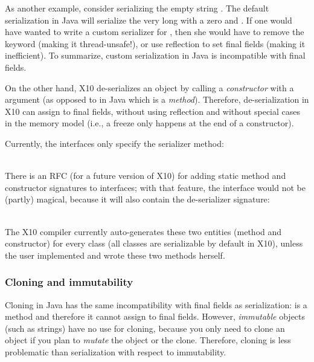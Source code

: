 As another example, consider serializing the empty string .
The default serialization in Java will serialize the very long  with a zero  and .
If one would have wanted to write a custom serializer for ,
    then she would have to remove the  keyword (making it thread-unsafe!),
    or use reflection to set final fields (making it inefficient).
To summarize, custom serialization in Java is incompatible with final fields.

On the other hand, X10 de-serializes an object by calling a \emph{constructor} with a 
    argument (as opposed to  in Java which is a \emph{method}).
Therefore, de-serialization in X10 can assign to final fields, without using reflection
    and without special cases in the memory model (i.e., a freeze only happens at the end of a constructor).

Currently, the  interfaces only specify the serializer method:

~~~~~~~~\\
There is an RFC (for a future version of X10) for adding static method and constructor signatures to interfaces;
    with that feature, the  interface would not be (partly) magical,
    because it will also contain the de-serializer signature:

~~~~~~~~\\
The X10 compiler currently auto-generates these two entities (method and constructor) for every class (all classes are serializable by default in X10),
    unless the user implemented  and wrote these two methods herself.

\subsubsection{Cloning and immutability}
\label{Section:Cloning}
Cloning in Java has the same incompatibility with final fields as serialization:
     is a method and therefore it cannot assign to final fields.
However, \emph{immutable} objects (such as strings) have no use for cloning,
    because you only need to clone an object if you plan to \emph{mutate} the object or the clone.
Therefore, cloning is less problematic than serialization with respect to immutability.

